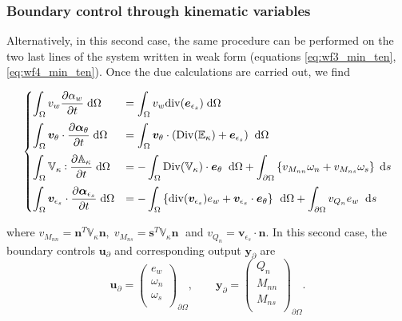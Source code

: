 \documentclass[preprint,12pt]{elsarticle}
\def\onedot{$\mathsurround0pt\ldotp$}
\def\cddot{%
	\mathbin{\vcenter{\baselineskip.67ex
			\hbox{\onedot}\hbox{\onedot}}%
}}
\begin{document}
\subsubsection{Boundary control through kinematic variables}
Alternatively, in this second case, the same procedure can be performed on the two last lines of the system written in weak form (equations \eqref{eq:wf3_min_ten}, \eqref{eq:wf4_min_ten}). Once the due calculations are carried out, we find

\begin{equation}
\label{eq:WF_Min_Kin}
\begin{cases}
\displaystyle\int_{\Omega} v_w \diffp{\alpha_w}{t}  \d\Omega  &= \displaystyle \int_{\Omega} v_w \mathrm{div}(\bm{e}_{\epsilon_s})  \d\Omega \vspace{2mm}\\
\displaystyle\int_{\Omega} \bm{v}_{\theta} \cdot \diffp{\bm\alpha_{\theta}}{t}   \d\Omega &= \displaystyle \int_{\Omega} \bm{v}_{\theta} \cdot (\mathrm{Div}(\mathbb{E}_{\kappa}) + \bm{e}_{\epsilon_s}) \;  \d\Omega \vspace{2mm} \\
\displaystyle\int_{\Omega} \mathbb{V}_{\kappa} \cddot \diffp{\mathbb{A}_{\kappa}}{t}   \d\Omega &= - \displaystyle\int_{\Omega} \mathrm{Div}(\mathbb{V}_{\kappa}) \cdot \bm{e}_\theta \;  \d\Omega +  \displaystyle\int_{\partial \Omega} \left\{ v_{M_{nn}} \omega_{n} + v_{M_{ns}} \omega_{s} \right\}  \d{s} \vspace{2mm} \\
\displaystyle\int_{\Omega} \bm{v}_{\epsilon_s} \cdot \diffp{\bm\alpha_{\epsilon_s}}{t}   \d\Omega &=  - \displaystyle\int_{\Omega} \left\{ \mathrm{div}(\bm{v}_{\epsilon_s}) e_w + \bm{v}_{\epsilon_s} \cdot \bm{e}_{\theta} \right\} \, \d\Omega + \displaystyle\int_{\partial \Omega} v_{Q_{n}} e_{w} \;  \d{s}
\end{cases}
\end{equation}

where $v_{M_{nn}} = \bm{n}^T \mathbb{V}_{\kappa} \bm{n}, \;  v_{M_{ns}} = \bm{s}^T \mathbb{V}_{\kappa} \bm{n} \;$ and $v_{Q_n} = \bm{v}_{\epsilon_s} \cdot \bm{n}$.
In this second case,  the boundary controls $\bm{u}_\partial$ and corresponding output $\bm{y}_\partial$ are
\[\bm{u}_\partial = 
\begin{pmatrix}
e_w \\
\omega_{n} \\
\omega_{s} \\
\end{pmatrix}_{\partial \Omega}, \qquad
\bm{y}_\partial = 
\begin{pmatrix}
Q_n \\
M_{nn} \\
M_{ns} \\
\end{pmatrix}_{\partial \Omega}.
\]
\end{document}
